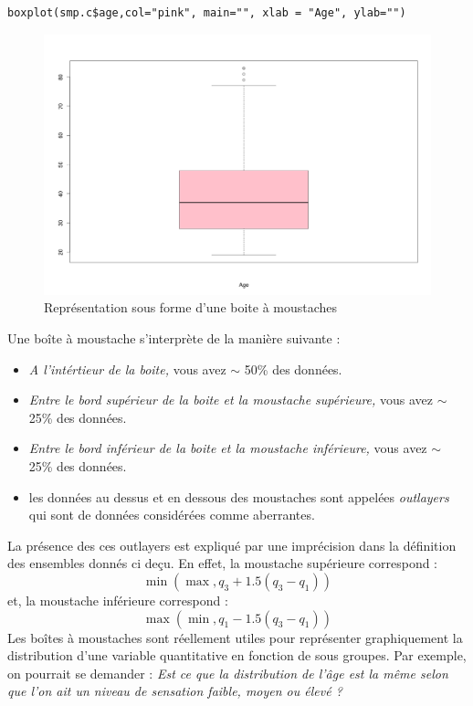 \begin{lstlisting}[language=html]
boxplot(smp.c$age,col="pink", main="", xlab = "Age", ylab="")
\end{lstlisting}
\begin{figure}[H]\begin{center}\includegraphics[scale=0.3]{ilu/tp4.png}\caption{Représentation sous forme d'une boite à moustaches}\end{center}\end{figure}
Une boîte à moustache s'interprète de la manière suivante : 
\begin{itemize}
\item \textit{A l'intértieur de la boite,} vous avez $\sim$ 50\% des données.
\item \textit{Entre le bord supérieur de la boite et la moustache supérieure,} vous avez $\sim$ 25\% des données.
\item \textit{Entre le bord inférieur de la boite et la moustache inférieure,} vous avez $\sim$ 25\% des données.
\item les données au dessus et en dessous des moustaches sont appelées \textit{outlayers} qui sont de données considérées comme aberrantes.
\end{itemize}
La présence des ces outlayers est expliqué par une imprécision dans la définition des ensembles donnés ci deçu. \newline
En effet, la moustache supérieure correspond :
$$\min(\max, q_{3} + 1.5 (q_{3}-q_{1}))$$
et, la moustache inférieure correspond :
$$\max(\min, q_{1} - 1.5 (q_{3}-q_{1}))$$
Les boîtes à moustaches sont réellement utiles pour représenter graphiquement la distribution d'une variable quantitative en fonction de sous groupes. Par exemple, on pourrait se demander : \textit{Est ce que la distribution de l'âge est la même selon que l'on ait un niveau de sensation faible, moyen ou élevé ?}\newline
